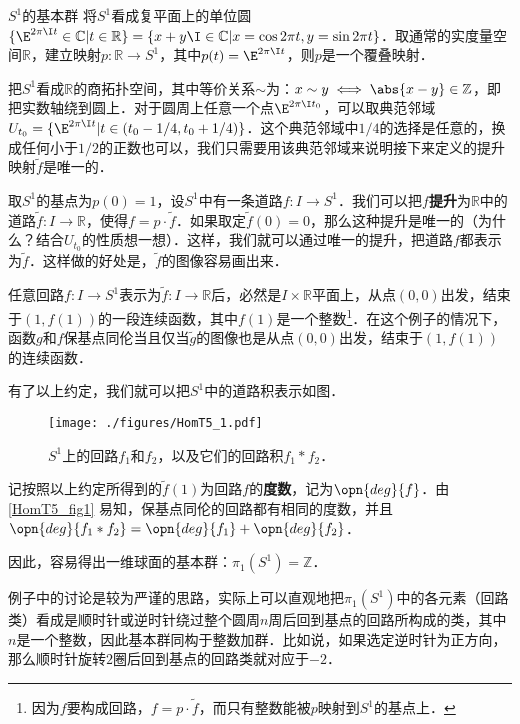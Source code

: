 
\begin{example}{$S^1$的基本群}
将$S^1$看成复平面上的单位圆$\{\E^{2\pi\I t}\in\mathbb{C}|t\in\mathbb{R}\}=\{x+y\I\in\mathbb{C}|x=\cos{2\pi t}, y=\sin{2\pi t}\}$．取通常的实度量空间$\mathbb{R}$，建立映射$p:\mathbb{R}\rightarrow S^1$，其中$p(t)=\E^{2\pi\I t}$，则$p$是一个覆叠映射．

把$S^1$看成$\mathbb{R}$的商拓扑空间，其中等价关系$\sim$为：$x\sim y\iff \abs{x-y}\in\mathbb{Z}$，即把实数轴绕到圆上．对于圆周上任意一个点$\E^{2\pi\I t_0}$，可以取典范邻域$U_{t_0}=\{\E^{2\pi\I t}|t\in(t_0-1/4, t_0+1/4)\}$．这个典范邻域中$1/4$的选择是任意的，换成任何小于$1/2$的正数也可以，我们只需要用该典范邻域来说明接下来定义的提升映射$\tilde{f}$是唯一的．

取$S^1$的基点为$p(0)=1$，设$S^1$中有一条道路$f:I\rightarrow S^1$．我们可以把$f$\textbf{提升}为$\mathbb{R}$中的道路$\tilde{f}:I\rightarrow\mathbb{R}$，使得$f=p\cdot\tilde{f}$．如果取定$\tilde{f}(0)=0$，那么这种提升是唯一的（为什么？结合$U_{t_0}$的性质想一想）．这样，我们就可以通过唯一的提升，把道路$f$都表示为$\tilde{f}$．这样做的好处是，$\tilde{f}$的图像容易画出来．

任意回路$f:I\rightarrow S^1$表示为$\tilde{f}:I\rightarrow\mathbb{R}$后，必然是$I\times\mathbb{R}$平面上，从点$(0, 0)$出发，结束于$(1, f(1))$的一段连续函数，其中$f(1)$是一个整数\footnote{因为$f$要构成回路，$f=p\cdot\tilde{f}$，而只有整数能被$p$映射到$S^1$的基点上．}．在这个例子的情况下，函数$g$和$f$保基点同伦当且仅当$\tilde{g}$的图像也是从点$(0, 0)$出发，结束于$(1, f(1))$的连续函数．

有了以上约定，我们就可以把$S^1$中的道路积表示如图．

\begin{figure}[ht]
\centering
\texttt{[image: ./figures/HomT5\_1.pdf]}
\caption{$S^1$上的回路$f_1$和$f_2$，以及它们的回路积$f_1*f_2$．} \label{HomT5_fig1}
\end{figure}

记按照以上约定所得到的$\tilde{f}(1)$为回路$f$的\textbf{度数}，记为$\opn{deg}{f}$．由\autoref{HomT5_fig1} 易知，保基点同伦的回路都有相同的度数，并且$\opn{deg}{f_1*f_2}=\opn{deg}{f_1}+\opn{deg}{f_2}$．

因此，容易得出一维球面的基本群：$\pi_1(S^1)=\mathbb{Z}$．


\end{example}

例子中的讨论是较为严谨的思路，实际上可以直观地把$\pi_1(S^1)$中的各元素（回路类）看成是顺时针或逆时针绕过整个圆周$n$周后回到基点的回路所构成的类，其中$n$是一个整数，因此基本群同构于整数加群．比如说，如果选定逆时针为正方向，那么顺时针旋转$2$圈后回到基点的回路类就对应于$-2$．


